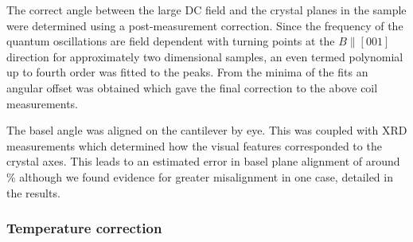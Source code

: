 The correct angle between the large DC field and the crystal planes in the sample were determined using a post-measurement correction. Since the frequency of the quantum oscillations are field dependent with turning points at the $B\parallel [001]$ direction for approximately two dimensional samples, an even termed polynomial up to fourth order was fitted to the peaks. From the minima of the fits an angular offset was obtained which gave the final correction to the above coil measurements.

The basel angle was aligned on the cantilever by eye. This was coupled with XRD measurements which determined how the visual features corresponded to the crystal axes. This leads to an estimated error in basel plane alignment of around \unit[5]{\%} although we found evidence for greater misalignment in one case, detailed in the results.

\subsubsection{Temperature correction}
    \label{Sec:Exp:TemepratureCorrection}


